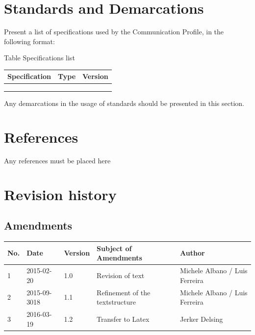 \documentclass{article}
\newcounter{Table}
\renewcommand\theTable{\arabic{Table}}
\begin{document}
\section[Standards and Demarcations]{Standards and Demarcations}
Present a list of specifications used by the Communication Profile, in the following format: 

Table \stepcounter{Table}{\theTable} Specifications list

\begin{flushleft}
\tablefirsthead{}
\tablehead{}
\tabletail{}
\tablelasttail{}
\begin{supertabular}{|m{3.1538599in}|m{1.8323599in}|m{0.8677598in}|}
\hline
{ Specification} &
{ Type} &
{ Version}\\\hline
 &
 &
\\\hline
 &
 &
\\\hline
 &
 &
\\\hline
\end{supertabular}
\end{flushleft}
Any demarcations in the usage of standards should be presented in this section. 

\section[References]{References}
Any references must be placed here

\section[Revision history]{Revision history}
\subsection[Amendments]{Amendments}
\begin{flushleft}
\tablefirsthead{}
\tablehead{}
\tabletail{}
\tablelasttail{}
\begin{supertabular}{|m{0.38305986in}|m{1.1441599in}|m{0.6219598in}|m{2.05316in}|m{1.4948599in}|}
\hline
{ No.} &
{ Date} &
{ Version} &
{ Subject of Amendments} &
{ Author}\\\hline
{ 1} &
{ 2015-02-20} &
{ 1.0} &
{ Revision of text} &
{ Michele Albano / Luis Ferreira}\\\hline
{ 2} &
{ 2015-09-3018} &
{ 1.1} &
{ Refinement of the textstructure} &
{ Michele Albano / Luis Ferreira}\\ & 2016-03-19 & 1.2 & Transfer to Latex & Jerker Delsing \\ \hline

\end{supertabular}
\end{flushleft}
\end{document}
